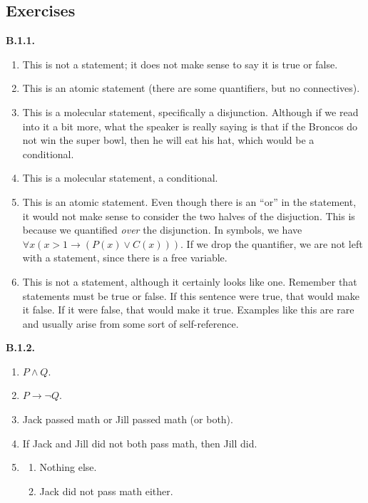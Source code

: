 \documentclass[10pt,]{book}
\theoremstyle{plain}
\theoremstyle{definition}
\theoremstyle{definition}
\theoremstyle{definition}
\theoremstyle{definition}
\numberwithin{equation}{chapter}
\def\imp{\rightarrow}
\begin{document}
\subsection*{ Exercises}
\noindent\textbf{B.1.1.} \hypertarget{p-1366}{}%
\leavevmode%
\begin{enumerate}[label=(\alph*)]
\item\hypertarget{li-329}{}This is not a statement; it does not make sense to say it is true or false.%
\item\hypertarget{li-330}{}This is an atomic statement (there are some quantifiers, but no connectives).%
\item\hypertarget{li-331}{}This is a molecular statement, specifically a disjunction.  Although if we read into it a bit more, what the speaker is really saying is that if the Broncos do not win the super bowl, then he will eat his hat, which would be a conditional.%
\item\hypertarget{li-332}{}This is a molecular statement, a conditional.%
\item\hypertarget{li-333}{}This is an atomic statement.  Even though there is an ``or'' in the statement, it would not make sense to consider the two halves of the disjuction.  This is because we quantified \emph{over} the disjunction.  In symbols, we have \(\forall x (x > 1 \imp (P(x) \vee C(x)))\).  If we drop the quantifier, we are not left with a statement, since there is a free variable.%
\item\hypertarget{li-334}{}This is not a statement, although it certainly looks like one.  Remember that statements must be true or false.  If this sentence were true, that would make it false.  If it were false, that would make it true.  Examples like this are rare and usually arise from some sort of self-reference.%
\end{enumerate}
%
\par\smallskip
\noindent\textbf{B.1.2.} \hypertarget{p-1373}{}%
\leavevmode%
\begin{enumerate}[label=(\alph*)]
\item\hypertarget{li-342}{}\(P \wedge Q\).%
\item\hypertarget{li-343}{}\(P \imp \neg Q\).%
\item\hypertarget{li-344}{}\hypertarget{p-1374}{}%
Jack passed math or Jill passed math (or both).%
\item\hypertarget{li-345}{}\hypertarget{p-1375}{}%
If Jack and Jill did not both pass math, then Jill did.%
\item\hypertarget{li-346}{}\hypertarget{p-1376}{}%
%
\begin{enumerate}[label=\roman*.]
\item\hypertarget{li-347}{}Nothing else.%
\item\hypertarget{li-348}{}Jack did not pass math either.%
\end{enumerate}
%
\end{enumerate}
\end{document}
